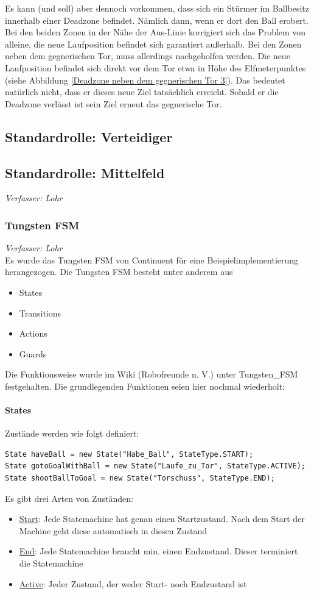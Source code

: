 \documentclass[fontsize=12pt,a4paper,final]{scrartcl}[2003/01/01]
\begin{document}
Es kann (und soll) aber dennoch vorkommen, dass sich ein Stürmer im Ballbesitz innerhalb einer Deadzone befindet. Nämlich dann, wenn er dort den Ball erobert. Bei den beiden Zonen in der Nähe der Aus-Linie korrigiert sich das Problem von alleine, die neue Laufposition befindet sich garantiert außerhalb. Bei den Zonen neben dem gegnerischen Tor, muss allerdings nachgeholfen werden. Die neue Laufposition befindet sich direkt vor dem Tor etwa in Höhe des Elfmeterpunktes (siehe Abbildung \ref{Deadzone neben dem gegnerischen Tor 3}). Das bedeutet natürlich nicht, dass er dieses neue Ziel tatsächlich erreicht. Sobald er die Deadzone verlässt ist sein Ziel erneut das gegnerische Tor.

\subsection{Standardrolle: Verteidiger}


\subsection{Standardrolle: Mittelfeld}
\textit{Verfasser: Lohr}\\

\subsubsection{Tungsten FSM}
\label{tungsten_fsm}
\textit{Verfasser: Lohr}\\
Es wurde das Tungsten FSM von Continuent für eine Beispielimplementierung herangezogen. Die Tungsten FSM besteht unter anderem aus
\begin{itemize}
 \item States
 \item Transitions
 \item Actions
 \item Guards
\end{itemize}
Die Funktionsweise wurde im Wiki (Robofreunde n. V.) unter Tungsten\_FSM festgehalten. Die grundlegenden Funktionen seien hier nochmal wiederholt:

\paragraph{States}
Zustände werden wie folgt definiert:
\begin{lstlisting}
State haveBall = new State("Habe_Ball", StateType.START);
State gotoGoalWithBall = new State("Laufe_zu_Tor", StateType.ACTIVE);
State shootBallToGoal = new State("Torschuss", StateType.END);
\end{lstlisting}
Es gibt drei Arten von Zuständen:
\begin{itemize}
 \item \underline{Start}: Jede Statemachine hat genau einen Startzustand. Nach dem Start der Machine geht diese automatisch in diesen Zustand
 \item \underline{End}: Jede Statemachine braucht min. einen Endzustand. Dieser terminiert die Statemachine
 \item \underline{Active}: Jeder Zustand, der weder Start- noch Endzustand ist
\end{itemize}
\end{document}
